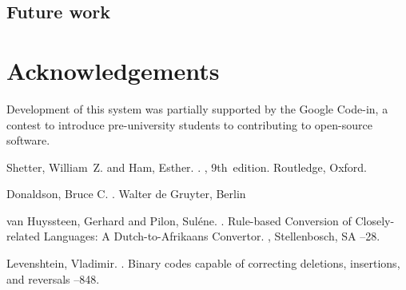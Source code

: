 \documentclass[11pt]{article}
\newcommand{\confname}{EAMT 2011}
\begin{document}
\subsection{Future work}

\section*{Acknowledgements}

Development of this system was partially supported by the Google Code-in,
a contest to introduce pre-university students to contributing to open-source
software.

% 

\begin{thebibliography}{}

Shetter, William~Z. and Ham, Esther.
.
, 9th~edition.
\newblock Routledge, Oxford.

Donaldson, Bruce C.
.
\newblock Walter de Gruyter, Berlin

van Huyssteen, Gerhard and Pilon, Suléne.
. 
\newblock Rule-based Conversion of Closely-related Languages: A Dutch-to-Afrikaans Convertor. 
, Stellenbosch, SA
--28.

Levenshtein, Vladimir.
. 
\newblock Binary codes capable of correcting deletions, insertions, and reversals
--848.


\end{thebibliography}
\end{document}
